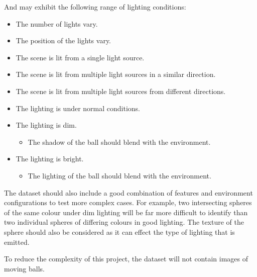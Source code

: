 \documentclass[11pt]{scrartcl}
\begin{document}
{{        	And may exhibit the following range of lighting conditions:

        	\begin{itemize}
        		\item The number of lights vary.
        		\item The position of the lights vary.
        		\item The scene is lit from a single light source.
        		\item The scene is lit from multiple light sources in a similar direction.
        		\item The scene is lit from multiple light sources from different directions.
        		\item The lighting is under normal conditions.
        		\item The lighting is dim.
        		\begin{itemize}
        			\item The shadow of the ball should blend with the environment.
        		\end{itemize}
        		\item The lighting is bright.
        		\begin{itemize}
        			\item The lighting of the ball should blend with the environment.
        		\end{itemize}
        	\end{itemize}

        	The dataset should also include a good combination of features and
        	environment configurations to test more complex cases. For example, two
        	intersecting spheres of the same colour under dim lighting will be far 
        	more difficult to identify than two individual spheres of differing
        	colours in good lighting. The texture of the sphere should also be
        	considered as it can effect the type of lighting that is emitted.


            To reduce the complexity of this project, the dataset will not contain
            images of moving balls.

        }

	}
\end{document}
